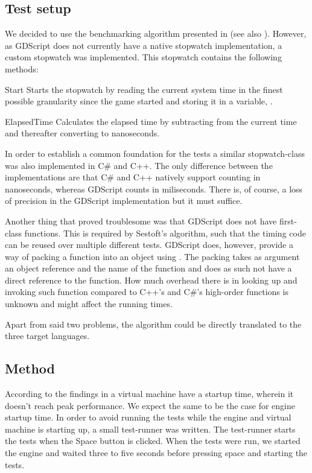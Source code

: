 \subsection{Test setup}
We decided to use the  benchmarking algorithm presented in \cite{sestoft2013microbenchmarks} (see also ). However, as GDScript does not currently have a native stopwatch implementation, a custom stopwatch was implemented. This stopwatch contains the following methods:
\begin{labeling}{\quad\quad}
    \item[Start] Starts the stopwatch by reading the current system time in the finest possible granularity since the game started and storing it in a variable, .
    \item[ElapsedTime] Calculates the elapsed time by subtracting  from the current time and thereafter converting to nanoseconds.
\end{labeling}
In order to establish a common foundation for the tests a similar stopwatch-class was also implemented in C\# and C++. The only difference between the implementations are that C\# and C++ natively support counting in nanoseconds, whereas GDScript counts in miliseconds. There is, of course, a loss of precision in the GDScript implementation but it must suffice. 

Another thing that proved troublesome was that GDScript does not have first-class functions. This is required by Sestoft's algorithm, such that the timing code can be reused over multiple different tests. GDScript does, however, provide a way of packing a function into an object using  \cite{godot:funcref}. The packing takes as argument an object reference and the name of the function and does as such not have a direct reference to the function. How much overhead there is in looking up and invoking such function compared to C++'s and C\#'s high-order functions is unknown and might affect the running times.

Apart from said two problems, the  algorithm could be directly translated to the three target languages.

\subsection{Method}
According to the findings in \cite{vmwarmup} a virtual machine have a startup time, wherein it doesn't reach peak performance. We expect the same to be the case for engine startup time. In order to avoid running the tests while the engine and virtual machine is starting up, a small test-runner was written. The test-runner starts the tests when the Space button is clicked. When the tests were run, we started the engine and waited three to five seconds before pressing space and starting the tests.

